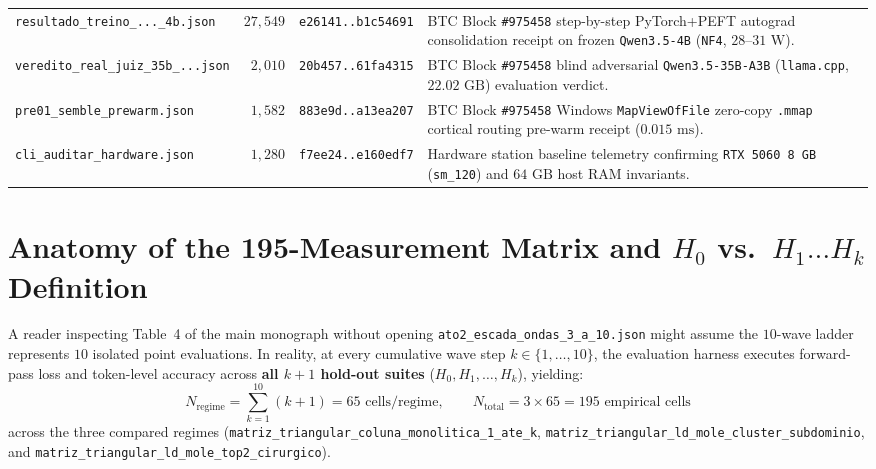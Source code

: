 \documentclass[10pt,a4paper]{article}
\begin{document}
\begin{table}[!htbp]
\begin{tabularx}{\linewidth}{@{}lrrY@{}}
\texttt{resultado\_\allowbreak{}treino\_\allowbreak{}...\_\allowbreak{}4b.json} & $27,549$ & \texttt{e26141..b1c54691} & BTC Block \texttt{\#975458} step-by-step PyTorch+PEFT autograd consolidation receipt on frozen \texttt{Qwen3.5-4B} (\texttt{NF4}, $28\text{--}31\text{ W}$). \\
\texttt{veredito\_\allowbreak{}real\_\allowbreak{}juiz\_\allowbreak{}35b\_\allowbreak{}...json} & $2,010$ & \texttt{20b457..61fa4315} & BTC Block \texttt{\#975458} blind adversarial \texttt{Qwen3.5-35B-A3B} (\texttt{llama.cpp}, $22.02\text{ GB}$) evaluation verdict. \\
\texttt{pre01\_\allowbreak{}semble\_\allowbreak{}prewarm.json} & $1,582$ & \texttt{883e9d..a13ea207} & BTC Block \texttt{\#975458} Windows \texttt{MapViewOfFile} zero-copy \texttt{.mmap} cortical routing pre-warm receipt ($0.015\text{ ms}$). \\
\texttt{cli\_\allowbreak{}auditar\_\allowbreak{}hardware.json} & $1,280$ & \texttt{f7ee24..e160edf7} & Hardware station baseline telemetry confirming \texttt{RTX 5060 8 GB} (\texttt{sm\_120}) and $64\text{ GB}$ host RAM invariants. \\
\bottomrule
\end{tabularx}
\end{table}

\section{Anatomy of the 195-Measurement Matrix and \texorpdfstring{$H_0$ vs.\ $H_1\dots H_k$}{H0 vs. H1..Hk} Definition}

A reader inspecting Table~4 of the main monograph without opening \texttt{ato2\_\allowbreak{}escada\_\allowbreak{}ondas\_\allowbreak{}3\_\allowbreak{}a\_\allowbreak{}10.json} might assume the $10$-wave ladder represents $10$ isolated point evaluations. In reality, at every cumulative wave step $k \in \{1,\dots,10\}$, the evaluation harness executes forward-pass loss and token-level accuracy across \textbf{all $k+1$ hold-out suites} ($H_0, H_1, \dots, H_k$), yielding:
\begin{equation}
  N_{\text{regime}} = \sum_{k=1}^{10} (k + 1) = 65 \text{ cells/regime}, \qquad
  N_{\text{total}} = 3 \times 65 = 195 \text{ empirical cells}
\end{equation}
across the three compared regimes (\texttt{matriz\_\allowbreak{}triangular\_\allowbreak{}coluna\_\allowbreak{}monolitica\_\allowbreak{}1\_\allowbreak{}ate\_\allowbreak{}k}, \texttt{matriz\_\allowbreak{}triangular\_\allowbreak{}ld\_\allowbreak{}mole\_\allowbreak{}cluster\_\allowbreak{}subdominio}, and \texttt{matriz\_\allowbreak{}triangular\_\allowbreak{}ld\_\allowbreak{}mole\_\allowbreak{}top2\_\allowbreak{}cirurgico}).
\end{document}
